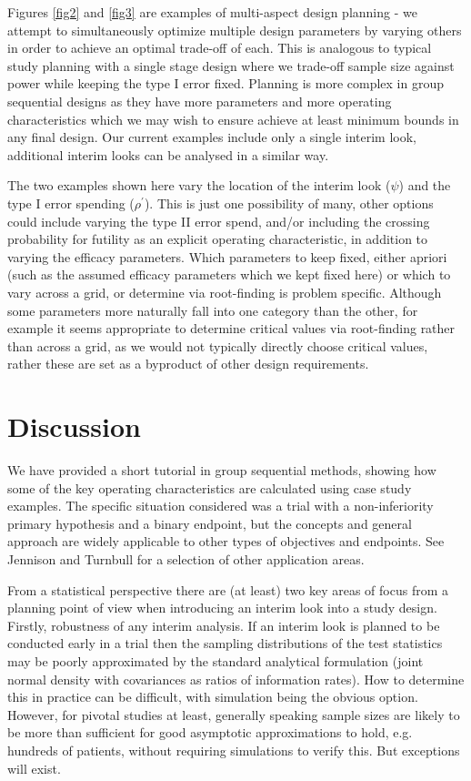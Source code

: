 \documentclass{article}
\begin{document}
Figures \ref{fig2} and \ref{fig3} are examples of multi-aspect design planning - we attempt to simultaneously optimize multiple design parameters by varying others in order to achieve an optimal trade-off of each. This is analogous to typical study planning with a single stage design where we trade-off sample size against power while keeping the type I error fixed. Planning is more complex in group sequential designs as they have more parameters and more operating characteristics which we may wish to ensure achieve at least minimum bounds in any final design. Our current examples include only a single interim look, additional interim looks can be analysed in a similar way.  

The two examples shown here vary the location of the interim look ($\psi$) and the type I error spending ($\rho^{\prime}$). This is just one possibility of many, other options could include varying the type II error spend, and/or including the crossing probability for futility as an explicit operating characteristic, in addition to varying the efficacy parameters. Which parameters to keep fixed, either apriori (such as the assumed efficacy parameters which we kept fixed here) or which to vary across a grid, or determine via root-finding is problem specific. Although some parameters more naturally fall into one category than the other, for example it seems appropriate to determine critical values via root-finding rather than across a grid, as we would not typically directly choose critical values, rather these are set as a byproduct of other design requirements.  



\section{Discussion}
We have provided a short tutorial in group sequential methods, showing how some of the key operating characteristics are calculated using case study examples. The specific situation considered was a trial with a non-inferiority primary hypothesis and a binary endpoint, but the concepts and general approach are widely applicable to other types of objectives and endpoints. See Jennison and Turnbull\citep{Jennison:2000aa} for a selection of other application areas.
  
From a statistical perspective there are (at least) two key areas of focus from a planning point of view when introducing an interim look into a study design. Firstly, robustness of any interim analysis. If an interim look is planned to be conducted early in a trial then the sampling distributions of the test statistics may be poorly approximated by the standard analytical formulation (joint normal density with covariances as ratios of information rates). How to determine this in practice can be difficult, with simulation being the obvious option. However, for pivotal studies at least, generally speaking sample sizes are likely to be more than sufficient for good asymptotic approximations to hold, e.g. hundreds of patients, without requiring simulations to verify this. But exceptions will exist. 
\end{document}
